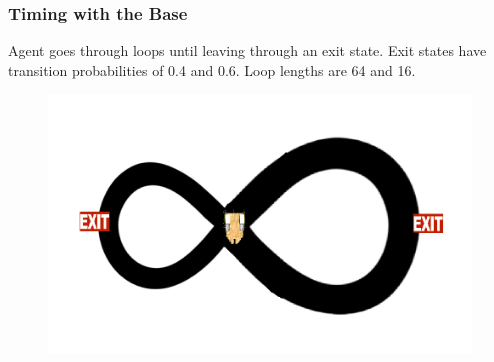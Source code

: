 \documentclass{beamer}
\begin{document}
\begin{frame}
\frametitle{Timing with the Base}
Agent goes through loops until leaving through an exit state. Exit states have transition probabilities of 0.4 and 0.6. Loop lengths are 64 and 16.
\begin{figure}
\includegraphics[width=0.8\linewidth]{lucasplots/monImages/doubleLoopImage.png}
\end{figure}
\end{frame}
\end{document}
